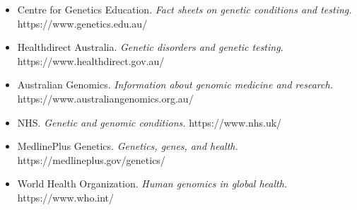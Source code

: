 \begin{itemize}
    \item Centre for Genetics Education. \textit{Fact sheets on genetic conditions and testing.} https://www.genetics.edu.au/
    \item Healthdirect Australia. \textit{Genetic disorders and genetic testing.} https://www.healthdirect.gov.au/
    \item Australian Genomics. \textit{Information about genomic medicine and research.} https://www.australiangenomics.org.au/
    \item NHS. \textit{Genetic and genomic conditions.} https://www.nhs.uk/
    \item MedlinePlus Genetics. \textit{Genetics, genes, and health.} https://medlineplus.gov/genetics/
    \item World Health Organization. \textit{Human genomics in global health.} https://www.who.int/
\end{itemize}
